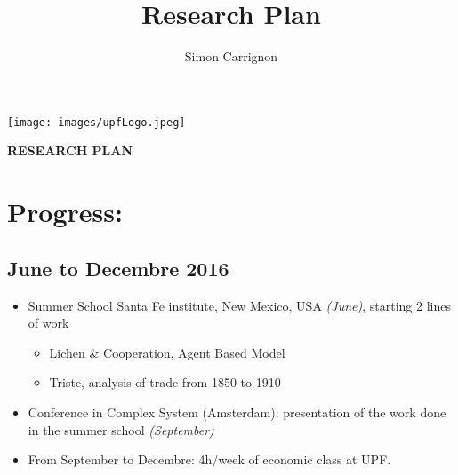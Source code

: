 \documentclass[a4paper]{article}
\title{Research Plan}
\author{Simon Carrignon}
\begin{document}
\vspace{-1cm}
\hspace{-1cm}
\begin{minipage}{.5\textwidth}
    \noindent \texttt{[image: images/upfLogo.jpeg]} 
\end{minipage}
\hfill
\begin{minipage}{.5\textwidth}
    \flushright
    \textbf{ \Large RESEARCH PLAN }
\end{minipage}

\vspace{3cm}

\hspace{-1cm}

\section*{Progress:}

\subsection*{June to Decembre 2016}
	\begin{itemize}
	    \item Summer School Santa Fe institute, New Mexico, USA \emph{(June)}, starting 2 lines of work
		\begin{itemize}
		    \item Lichen \& Cooperation, Agent Based Model  
		    \item Triste, analysis of trade from 1850 to 1910
		\end{itemize}
	    \item Conference in Complex System (Amsterdam): presentation of the work done in the summer school \emph{(September)}
	    \item From September to Decembre: 4h/week of economic class at UPF.
	\end{itemize}
\end{document}
